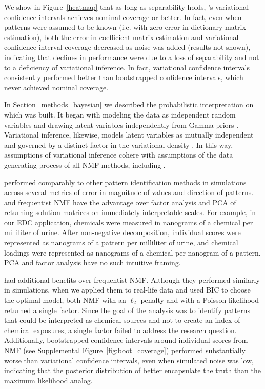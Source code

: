 We show in Figure~\ref{heatmap} that as long as separability holds, \bnmfc's variational confidence intervals achieves nominal coverage or better. In fact, even when patterns were assumed to be known (i.e. with zero error in dictionary matrix estimation), both the error in coefficient matrix estimation and variational confidence interval coverage decreased as noise was added (results not shown), indicating that declines in performance were due to a loss of separability and not to a deficiency of variational inference. In fact, variational confidence intervals consistently performed better than bootstrapped confidence intervals, which never achieved nominal coverage.

In Section~\ref{methods_bayesian} we described the probabilistic interpretation on which \bnmf was built. It began with modeling the data as independent random variables and drawing latent variables independently from Gamma priors \cite{cemgil2008bayesian, paisley2014bayesian}. Variational inference, likewise, models latent variables as mutually independent and governed by a distinct factor in the variational density \cite{blei2017variational}. In this way, assumptions of variational inference cohere with assumptions of the data generating process of all NMF methods, including \bnmf.

\bnmf performed comparably to other pattern identification methods in simulations across several metrics of error in magnitude of values and direction of patterns. \bnmf and frequentist NMF have the advantage over factor analysis and PCA of returning solution matrices on immediately interpretable scales. For example, in our EDC application, chemicals were measured in nanograms of a chemical per milliliter of urine. After non-negative decomposition, individual scores were represented as nanograms of a pattern per milliliter of urine, and chemical loadings were represented as nanograms of a chemical per nanogram of a pattern. PCA and factor analysis have no such intuitive framing.

\bnmf had additional benefits over frequentist NMF. Although they performed similarly in simulations, when we applied them to real-life data and used BIC to choose the optimal model, both NMF with an $\ell_2$ penalty and with a Poisson likelihood returned a single factor. Since the goal of the analysis was to identify patterns that could be interpreted as chemical sources and not to create an index of chemical exposures, a single factor failed to address the research question. Additionally, bootstrapped confidence intervals around individual scores from NMF (see Supplemental Figure~\ref{fig:boot_coverage}) performed substantially worse than variational confidence intervals, even when simulated noise was low, indicating that the posterior distribution of \bnmf better encapsulate the truth than the maximum likelihood analog.

